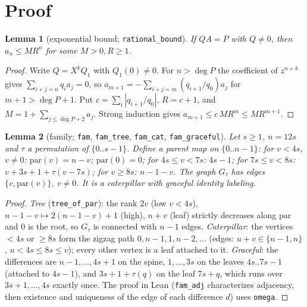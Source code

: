 \documentclass[11pt]{article}
\newtheorem{lemma}{Lemma}
\begin{document}
\section*{Proof}
\begin{lemma}[exponential bound; \texttt{rational\_bound}]
If $Q A=P$ with $Q\neq 0$, then $a_n\le M R^n$ for some $M>0,R\ge 1$.
\end{lemma}
\begin{proof}
Write $Q=X^kQ_1$ with $Q_1(0)\ne 0$. For $n>\deg P$ the coefficient of $z^{n+k}$ gives $\sum_{i+j=n} q_i a_j=0$, so $a_{m+1}=-\sum_{i+j=m}(q_{i+1}/q_0)a_j$ for $m+1>\deg P+1$. Put $c=\sum_i|q_{i+1}/q_0|$, $R=c+1$, and $M=1+\sum_{j\le \deg P+2}a_j$. Strong induction gives $a_{m+1}\le c\,M R^m\le M R^{m+1}$.
\end{proof}

\begin{lemma}[family; \texttt{fam}, \texttt{fam\_tree}, \texttt{fam\_cat}, \texttt{fam\_graceful}]
Let $s\ge1$, $n=12s$ and $\tau$ a permutation of $\{0..s-1\}$. Define a parent map on $\{0..n-1\}$: for $v<4s$, $v\ne0$: $\mathrm{par}(v)=n-v$; $\mathrm{par}(0)=0$; for $4s\le v<7s$: $4s-1$; for $7s\le v<8s$: $v+3s+1+\tau(v-7s)$; for $v\ge 8s$: $n-1-v$. The graph $G_\tau$ has edges $\{v,\mathrm{par}(v)\}$, $v\ne0$. It is a caterpillar with graceful identity labeling.
\end{lemma}
\begin{proof}
\emph{Tree} (\texttt{tree\_of\_par}): the rank $2v$ (low $v<4s$), $n-1-v\mapsto 2(n-1-v)+1$ (high), $n+v$ (leaf) strictly decreases along $\mathrm{par}$ and $0$ is the root, so $G_\tau$ is connected with $n-1$ edges. \emph{Caterpillar}: the vertices $<4s$ or $\ge 8s$ form the zigzag path $0,n-1,1,n-2,\dots$ (edges: $u+v\in\{n-1,n\}$, $u<4s\le 8s\le v$); every other vertex is a leaf attached to it. \emph{Graceful}: the differences are $n-1,\dots,4s+1$ on the spine, $1,\dots,3s$ on the leaves $4s..7s-1$ (attached to $4s-1$), and $3s+1+\tau(q)$ on the leaf $7s+q$, which runs over $3s+1,\dots,4s$ exactly once. The proof in Lean (\texttt{fam\_adj} characterizes adjacency, then existence and uniqueness of the edge of each difference $d$) uses \texttt{omega}.
\end{proof}
\end{document}
